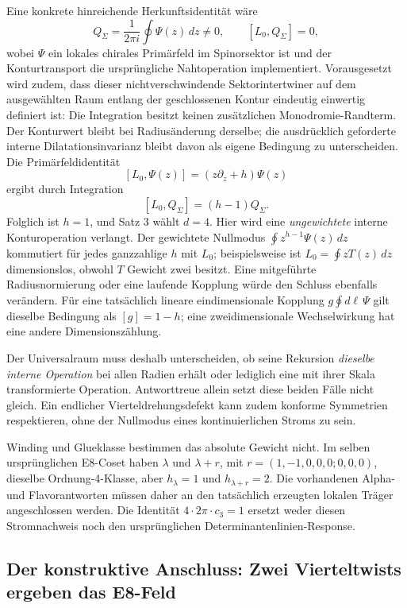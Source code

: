 Eine konkrete hinreichende Herkunftsidentität wäre
\begin{equation}\label{eq:seamcontouridentity}
 Q_\Sigma=\frac1{2\pi i}\oint\Psi(z)\,dz\ne0,
 \qquad [L_0,Q_\Sigma]=0,
\end{equation}
wobei $\Psi$ ein lokales chirales Primärfeld im Spinorsektor ist und der Konturtransport die ursprüngliche Nahtoperation implementiert. Vorausgesetzt wird zudem, dass dieser nichtverschwindende Sektorintertwiner auf dem ausgewählten Raum entlang der geschlossenen Kontur eindeutig einwertig definiert ist: Die Integration besitzt keinen zusätzlichen Monodromie-Randterm. Der Konturwert bleibt bei Radiusänderung derselbe; die ausdrücklich geforderte interne Dilatationsinvarianz bleibt davon als eigene Bedingung zu unterscheiden. Die Primärfeldidentität
\[
 [L_0,\Psi(z)]=(z\partial_z+h)\Psi(z)
\]
ergibt durch Integration
\[
 [L_0,Q_\Sigma]=(h-1)Q_\Sigma.
\]
Folglich ist $h=1$, und Satz 3 wählt $d=4$. Hier wird eine \emph{ungewichtete} interne Konturoperation verlangt. Der gewichtete Nullmodus $\oint z^{h-1}\Psi(z)\,dz$ kommutiert für jedes ganzzahlige $h$ mit $L_0$; beispielsweise ist $L_0=\oint zT(z)\,dz$ dimensionslos, obwohl $T$ Gewicht zwei besitzt. Eine mitgeführte Radiusnormierung oder eine laufende Kopplung würde den Schluss ebenfalls verändern. Für eine tatsächlich lineare eindimensionale Kopplung $g\oint d\ell\,\Psi$ gilt dieselbe Bedingung als $[g]=1-h$; eine zweidimensionale Wechselwirkung hat eine andere Dimensionszählung.

Der Universalraum muss deshalb unterscheiden, ob seine Rekursion \emph{dieselbe interne Operation} bei allen Radien erhält oder lediglich eine mit ihrer Skala transformierte Operation. Antworttreue allein setzt diese beiden Fälle nicht gleich. Ein endlicher Vierteldrehungsdefekt kann zudem konforme Symmetrien respektieren, ohne der Nullmodus eines kontinuierlichen Stroms zu sein.

Winding und Glueklasse bestimmen das absolute Gewicht nicht. Im selben ursprünglichen E8-Coset haben $\lambda$ und $\lambda+r$, mit $r=(1,-1,0,0,0;0,0,0)$, dieselbe Ordnung-4-Klasse, aber $h_\lambda=1$ und $h_{\lambda+r}=2$. Die vorhandenen Alpha- und Flavorantworten müssen daher an den tatsächlich erzeugten lokalen Träger angeschlossen werden. Die Identität $4\cdot2\pi\cdot c_3=1$ ersetzt weder diesen Stromnachweis noch den ursprünglichen Determinantenlinien-Response.

\subsection{Der konstruktive Anschluss: Zwei Vierteltwists ergeben das E8-Feld}\label{sec:doubletwistbridge}

